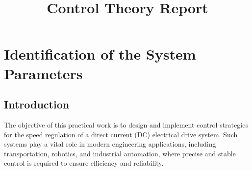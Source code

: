 \documentclass{rapportCS}
\title{Control Theory Report} %
\begin{document}






        
\fairemarges %
\fairepagedegarde %

\begin{center}
	\begin{abstract}
        \lipsum[1-2]
    \end{abstract}
\end{center}
\newpage


\tabledematieres %




\section{Identification of the System Parameters}

\subsection{Introduction}

The objective of this practical work is to design and implement control strategies for the speed regulation of a direct current (DC) electrical drive system. Such systems play a vital role in modern engineering applications, including transportation, robotics, and industrial automation, where precise and stable control is required to ensure efficiency and reliability.
\end{document}
